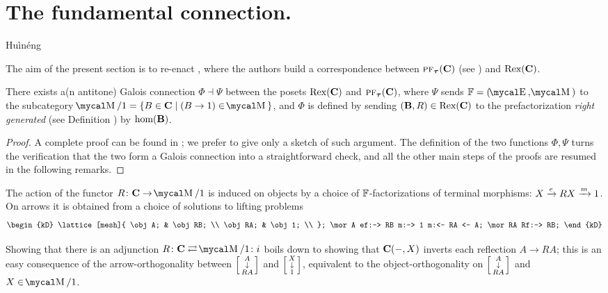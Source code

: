 \section{The fundamental connection.}\label{fundconn}
\epigraph{}{Huìnéng}
The aim of the present section is to re\hyp{}enact \cite[\aprop \textbf{2.2}]{CHK}, where the authors build a correspondence between $\text{\scshape pf}_{\boldsymbol{\tau}}(\textbf{C})$ (see \adef {}) and $\text{Rex}(\textbf{C})$.
\begin{proposition}\label{connectio}
There exists a(n antitone) Galois connection $\Phi\dashv \Psi$ between the posets $\text{Rex}(\textbf{C})$ and $\text{\scshape pf}_{\boldsymbol{\tau}}(\textbf{C})$, where $\Psi$ sends $\fF=(\EE,\MM)$ to the subcategory $\MM/1 = \{B\in\CC\mid (B\to 1)\in\MM\}$, and $\Phi$ is defined by sending $(\textbf{B},R)\in\text{Rex}(\textbf{C})$ to the prefactorization \emph{right generated} (see Definition ) by $\text{hom}(\textbf{B})$. 
\end{proposition}
\begin{proof}
A complete proof can be found in \cite{CHK}; we prefer to give only a sketch of such argument. The definition of the two functions $\Phi, \Psi$ turns the verification that the two form a Galois connection into a straightforward check, and all the other main steps of the proofs are resumed in the following remarks.
\end{proof}
\begin{remark}\label{funtoriali}
The action of the functor $R\colon \CC\to \MM/1$ is induced on objects by a choice of $\mathbb{F}$\hyp{}factorizations of terminal morphisms: $X\xrightarrow{e} RX\xrightarrow{m} 1$. On arrows it is obtained from a choice of solutions to lifting problems
\[
\begin{kD}
\lattice[mesh]{
	\obj A; & \obj RB; \\
	\obj RA; & \obj 1; \\
};
\mor A ef:-> RB m:-> 1 m:<- RA <- A;
\mor RA Rf:-> RB;
\end{kD}
\]
\end{remark}
\begin{remark}
Showing that there is an adjunction $R\colon \CC\rightleftarrows \MM/1 \colon i$ boils down to showing that $\textbf{C}(-, X)$ inverts each reflection $A\to RA$; this is an easy consequence of the arrow\hyp{}orthogonality between $\left[ \begin{smallmatrix} A \\ \downarrow \\ RA \end{smallmatrix} \right]$ and $\left[ \begin{smallmatrix} X \\ \downarrow \\ 1 \end{smallmatrix} \right]$, equivalent to the object\hyp{}orthogonality on $\left[ \begin{smallmatrix} A \\ \downarrow \\ RA \end{smallmatrix} \right]$ and $X\in \MM/1$.
\end{remark}
